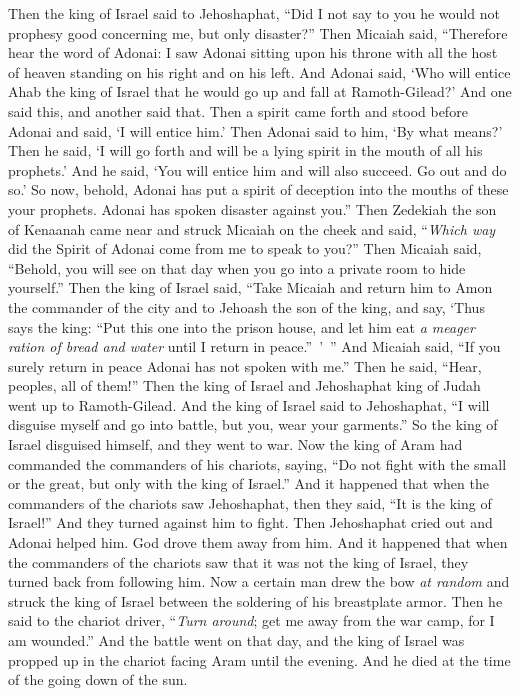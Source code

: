 \begin{biblechapter}
\verse Then the king of Israel said to Jehoshaphat, “Did I not say to you he would not prophesy good concerning me, but only disaster?”
\verse Then Micaiah said, “Therefore hear the word of Adonai: I saw Adonai sitting upon his throne with all the host of heaven standing on his right and on his left.
\verse And Adonai said, ‘Who will entice Ahab the king of Israel that he would go up and fall at Ramoth-Gilead?’ And one said this, and another said that.
\verse Then a spirit came forth and stood before Adonai and said, ‘I will entice him.’ Then Adonai said to him, ‘By what means?’
\verse Then he said, ‘I will go forth and will be a lying spirit in the mouth of all his prophets.’ And he said, ‘You will entice him and will also succeed. Go out and do so.’
\verse So now, behold, Adonai has put a spirit of deception into the mouths of these your prophets. Adonai has spoken disaster against you.”
\verse Then Zedekiah the son of Kenaanah came near and struck Micaiah on the cheek and said, “\textit{Which way} did the Spirit of Adonai come from me to speak to you?”
\verse Then Micaiah said, “Behold, you will see on that day when you go into a private room to hide yourself.”
\verse Then the king of Israel said, “Take Micaiah and return him to Amon the commander of the city and to Jehoash the son of the king,
\verse and say, ‘Thus says the king: “Put this one into the prison house, and let him eat \textit{a meager ration of bread and water} until I return in peace.” ’ ”
\verse And Micaiah said, “If you surely return in peace Adonai has not spoken with me.” Then he said, “Hear, peoples, all of them!”
 Then the king of Israel and Jehoshaphat king of Judah went up to Ramoth-Gilead.
\verse And the king of Israel said to Jehoshaphat, “I will disguise myself and go into battle, but you, wear your garments.” So the king of Israel disguised himself, and they went to war.
\verse Now the king of Aram had commanded the commanders of his chariots, saying, “Do not fight with the small or the great, but only with the king of Israel.”
\verse And it happened that when the commanders of the chariots saw Jehoshaphat, then they said, “It is the king of Israel!” And they turned against him to fight. Then Jehoshaphat cried out and Adonai helped him. God drove them away from him.
\verse And it happened that when the commanders of the chariots saw that it was not the king of Israel, they turned back from following him.
\verse Now a certain man drew the bow \textit{at random} and struck the king of Israel between the soldering of his breastplate armor. Then he said to the chariot driver, “\textit{Turn around}; get me away from the war camp, for I am wounded.”
\verse And the battle went on that day, and the king of Israel was propped up in the chariot facing Aram until the evening. And he died at the time of the going down of the sun.
\end{biblechapter}

